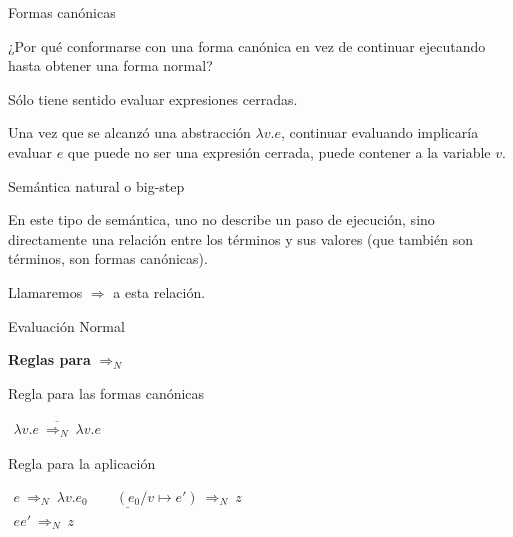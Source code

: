 \documentclass[handout]{beamer}
\begin{document}
\begin{frame}{Formas canónicas}

¿Por qué conformarse con una forma canónica en vez de continuar ejecutando hasta
obtener una forma normal? \pause

\bigskip

Sólo tiene sentido evaluar expresiones cerradas. \pause

\bigskip

Una vez que se alcanzó una abstracción $\lambda v.e$, continuar evaluando implicaría evaluar $e$ que puede no ser una expresión cerrada, puede contener a la variable $v$.

\end{frame}


\begin{frame}{Semántica natural o big-step}

  En este tipo de semántica, uno no describe un paso de ejecución,
  sino directamente una relación entre los términos y sus valores (que
  también son términos, son formas canónicas). \pause

\bigskip

Llamaremos $\Rightarrow$ a esta relación.

\end{frame}



\begin{frame}{Evaluación Normal}

\textbf{Reglas para} $\Rightarrow_N$

\bigskip

Regla para las formas canónicas

\bigskip

$\begin{array}{c}
\overline{\lambda v.e\ \Rightarrow_N\ \lambda v.e}
\end{array}
$
\pause
\bigskip

\medskip


Regla para la aplicación

\bigskip

$\begin{array}{c}
\underline{e\ \Rightarrow_N\ \lambda v.e_0\qquad (e_0/v\mapsto e')\ \Rightarrow_N\ z}\\
ee'\ \Rightarrow_N\ z
\end{array}
$

\end{frame}
\end{document}

